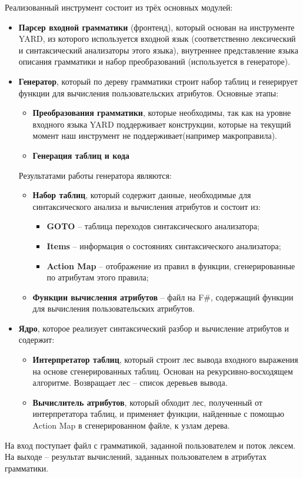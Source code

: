 Реализованный инструмент состоит из трёх основных модулей:
\begin{itemize}
	\item {\bfseries Парсер входной грамматики} (фронтенд), который основан на инструменте YARD, из которого используется входной язык (соответственно лексический и синтаксический анализаторы этого языка), внутреннее представление языка описания грамматики и набор преобразований (используется в генераторе). 
	
	\item {\bfseries Генератор}, который по дереву грамматики строит набор таблиц и генерирует функции для вычисления пользовательских атрибутов. Основные этапы:
		\begin{itemize}
			\item {\bfseries Преобразования грамматики}, которые необходимы, так как на уровне входного языка YARD поддерживает конструкции, которые на текущий момент наш инструмент не поддерживает(например макроправила).
				\item {\bfseries Генерация таблиц и кода}
		\end{itemize}
		Результатами работы генератора являются:
		\begin{itemize}
			\item {\bfseries Набор таблиц}, который содержит данные, необходимые для синтаксического анализа и вычисления атрибутов и состоит из:
			\begin{itemize}
				\item {\bfseries GOTO} -- таблица переходов синтаксического анализатора;
		  	\item {\bfseries Items} -- информация о состояниях  синтаксического анализатора;
		  	\item {\bfseries Action Map} -- отображение из правил в функции,  сгенерированные по атрибутам этого правила;
			\end{itemize}
			
		  \item {\bfseries Функции вычисления атрибутов } -- файл на F\#, содержащий функции для вычисления пользовательских атрибутов.
		\end{itemize}
		
		
	\item {\bfseries Ядро}, которое реализует синтаксический разбор и вычисление атрибутов и содержит:
		\begin{itemize}
			\item {\bfseries Интерпретатор таблиц}, который строит лес вывода входного выражения на основе сгенерированных таблиц. Основан на рекурсивно-восходящем алгоритме. Возвращает лес -- список деревьев вывода.
			\item {\bfseries Вычислитель атрибутов}, который обходит лес, полученный от интерпретатора таблиц, и применяет функции, найденные с помощью Action Map в сгенерированном файле, к узлам дерева.
		\end{itemize}
		
\end{itemize}

На вход поступает файл с грамматикой, заданной пользователем и поток лексем. На выходе -- результат вычислений, заданных пользователем в атрибутах грамматики.
